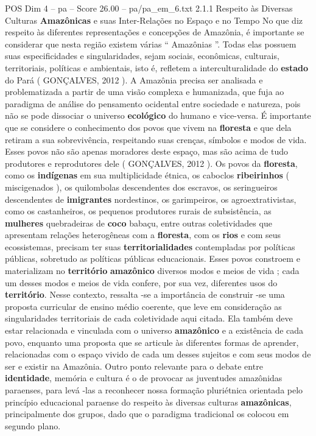 \begin{textsample}{POS Dim 4 – pa – Score 26.00 – pa/pa\_em\_6.txt}  \label{ex:f4_pos_001}
2.1.1 Respeito às Diversas Culturas \textbf{Amazônicas} e suas Inter-Relações no Espaço e no Tempo No que diz respeito às diferentes representações e concepções de Amazônia, é importante se considerar que nesta região existem várias “ Amazônias ”.
Todas elas possuem suas especificidades e singularidades, sejam sociais, econômicas, culturais, territoriais, políticas e ambientais, isto é, refletem a interculturalidade do \textbf{estado} do Pará ( GONÇALVES, 2012 ).
A Amazônia precisa ser analisada e problematizada a partir de uma visão complexa e humanizada, que fuja ao paradigma de análise do pensamento ocidental entre sociedade e natureza, pois não se pode dissociar o universo \textbf{ecológico} do humano e vice-versa.
É importante que se considere o conhecimento dos povos que vivem na \textbf{floresta} e que dela retiram a sua sobrevivência, respeitando suas crenças, símbolos e modos de vida.
Esses povos não são apenas moradores deste espaço, mas são acima de tudo produtores e reprodutores dele ( GONÇALVES, 2012 ).
Os povos da \textbf{floresta}, como os \textbf{indígenas} em sua multiplicidade étnica, os caboclos \textbf{ribeirinhos} ( miscigenados ), os quilombolas descendentes dos escravos, os seringueiros descendentes de \textbf{imigrantes} nordestinos, os garimpeiros, os agroextrativistas, como os castanheiros, os pequenos produtores rurais de subsistência, as \textbf{mulheres} quebradeiras de \textbf{coco} babaçu, entre outras coletividades que apresentam relações heterogêneas com a \textbf{floresta}, com os \textbf{rios} e com seus ecossistemas, precisam ter suas \textbf{territorialidades} contempladas por políticas públicas, sobretudo as políticas públicas educacionais.
Esses povos constroem e materializam no \textbf{território} \textbf{amazônico} diversos modos e meios de vida ; cada um desses modos e meios de vida confere, por sua vez, diferentes usos do \textbf{território}.
Nesse contexto, ressalta -se a importância de construir -se uma proposta curricular de ensino médio coerente, que leve em consideração as singularidades territoriais de cada coletividade aqui citada.
Ela também deve estar relacionada e vinculada com o universo \textbf{amazônico} e a existência de cada povo, enquanto uma proposta que se articule às diferentes formas de aprender, relacionadas com o espaço vivido de cada um desses sujeitos e com seus modos de ser e existir na Amazônia.
Outro ponto relevante para o debate entre \textbf{identidade}, memória e cultura é o de provocar as juventudes amazônidas paraenses, para levá -las a reconhecer nossa formação pluriétnica orientada pelo princípio educacional paraense do respeito às diversas culturas \textbf{amazônicas}, principalmente dos grupos, dado que o paradigma tradicional os colocou em segundo plano.

\end{textsample}
